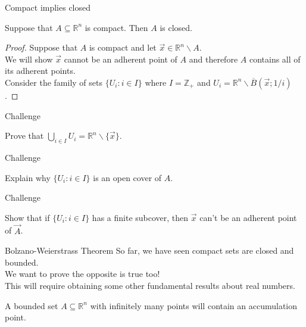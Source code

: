 \documentclass{beamer}
\begin{document}
\begin{frame}{Compact implies closed}
\begin{thm}
Suppose that $A\subseteq\mathbb{R}^n$ is compact.
Then $A$ is closed.
\end{thm}
\begin{proof}
Suppose that $A$ is compact and let $\vec x\in \mathbb{R}^n\backslash A$.\\
We will show $\vec x$ cannot be an adherent point of $A$ and therefore $A$ contains all of its adherent points.\\
Consider the family of sets $\{U_i: i\in I\}$ where $I=\mathbb{Z}_+$ and $U_i = \mathbb{R}^n\backslash \overline B(\vec x; 1/i)$.
\end{proof}
\end{frame}

\begin{frame}{Challenge}
\begin{prob}
Prove that $\bigcup_{i\in I} U_i = \mathbb{R}^n\backslash \{\vec x\}$.
\end{prob}
\end{frame}

\begin{frame}{Challenge}
\begin{prob}
Explain why $\{U_i: i\in I\}$ is an open cover of $A$.
\end{prob}
\end{frame}

\begin{frame}{Challenge}
\begin{prob}
Show that if $\{U_i: i\in I\}$ has a finite subcover, then $\vec x$ can't be an adherent point of $\vec A$.
\end{prob}
\end{frame}

\begin{frame}{Bolzano-Weierstrass Theorem}
So far, we have seen compact sets are closed and bounded.\\
We want to prove the opposite is true too!\\
This will require obtaining some other fundamental results about real numbers.
\begin{thm}
A bounded set $A\subseteq \mathbb{R}^n$ with infinitely many points will contain an accumulation point.
\end{thm}
\end{frame}
\end{document}
